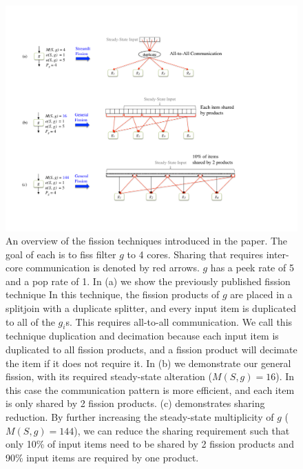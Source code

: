 \documentclass[]{article}
\begin{document}
\begin{figure}
\centering
\includegraphics[width=\textwidth]{overview.pdf}
\vspace{20pt}
\caption[An overview of fission techniques.]  {
An overview of the fission techniques introduced in the paper.  The
goal of each is to fiss filter $g$ to 4 cores.  Sharing that requires
inter-core communication is denoted by red arrows. $g$ has a peek rate of
5 and a pop rate of 1.  In (a) we show the previously published fission technique
In this technique, the fission products of $g$ are placed in a splitjoin with a duplicate
splitter, and every input item is duplicated to all of the $g_i$s.
This requires all-to-all communication.  We call this technique
duplication and decimation because each input item is duplicated to
all fission products, and a fission product will decimate the item if
it does not require it.  In (b) we demonstrate our general fission, with its required steady-state alteration ($M(S, g) = 16$).  In this case the communication pattern is more efficient, and
each item is only shared by 2 fission products.  (c) demonstrates
sharing reduction.  By further increasing the steady-state
multiplicity of $g$ ($M(S, g) = 144$), we can reduce the sharing
requirement such that only 10\% of input items need to be shared by 2
fission products and 90\% input items are required by one product.
\label{fig:fission-overview}}
\end{figure}
\end{document}
